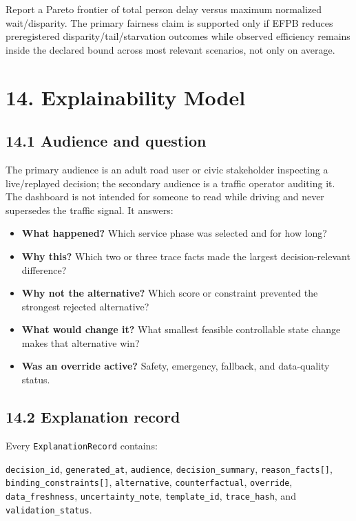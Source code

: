 \documentclass[
  english,
  11pt,
  a4paper,
]{article}
\providecommand{\tightlist}{%
  \setlength{\itemsep}{0pt}\setlength{\parskip}{0pt}}
\begin{document}
Report a Pareto frontier of total person delay versus maximum normalized
wait/disparity. The primary fairness claim is supported only if EFPB
reduces preregistered disparity/tail/starvation outcomes while observed
efficiency remains inside the declared bound across most relevant
scenarios, not only on average.

\section{14. Explainability Model}\label{explainability-model}

\subsection{14.1 Audience and question}\label{audience-and-question}

The primary audience is an adult road user or civic stakeholder
inspecting a live/replayed decision; the secondary audience is a traffic
operator auditing it. The dashboard is not intended for someone to read
while driving and never supersedes the traffic signal. It answers:

\begin{itemize}
\tightlist
\item
  \textbf{What happened?} Which service phase was selected and for how
  long?
\item
  \textbf{Why this?} Which two or three trace facts made the largest
  decision-relevant difference?
\item
  \textbf{Why not the alternative?} Which score or constraint prevented
  the strongest rejected alternative?
\item
  \textbf{What would change it?} What smallest feasible controllable
  state change makes that alternative win?
\item
  \textbf{Was an override active?} Safety, emergency, fallback, and
  data-quality status.
\end{itemize}

\subsection{14.2 Explanation record}\label{explanation-record}

Every \texttt{ExplanationRecord} contains:

\texttt{decision\_id}, \texttt{generated\_at}, \texttt{audience},
\texttt{decision\_summary}, \texttt{reason\_facts{[}{]}},
\texttt{binding\_constraints{[}{]}}, \texttt{alternative},
\texttt{counterfactual}, \texttt{override}, \texttt{data\_freshness},
\texttt{uncertainty\_note}, \texttt{template\_id}, \texttt{trace\_hash},
and \texttt{validation\_status}.
\end{document}
